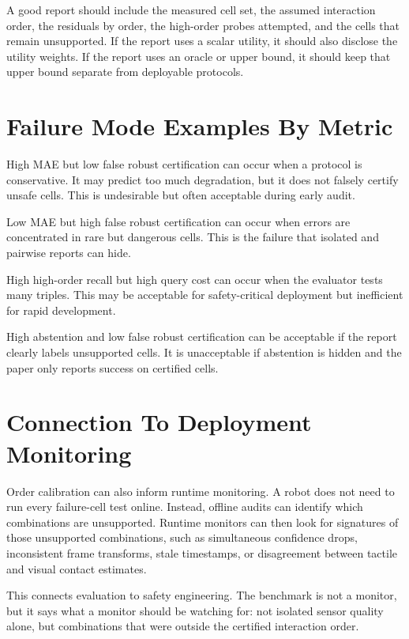 \documentclass{article}
\begin{document}
A good report should include the measured cell set, the assumed interaction order, the residuals by order, the high-order probes attempted, and the cells that remain unsupported. If the report uses a scalar utility, it should also disclose the utility weights. If the report uses an oracle or upper bound, it should keep that upper bound separate from deployable protocols.

\section{Failure Mode Examples By Metric}

High MAE but low false robust certification can occur when a protocol is conservative. It may predict too much degradation, but it does not falsely certify unsafe cells. This is undesirable but often acceptable during early audit.

Low MAE but high false robust certification can occur when errors are concentrated in rare but dangerous cells. This is the failure that isolated and pairwise reports can hide.

High high-order recall but high query cost can occur when the evaluator tests many triples. This may be acceptable for safety-critical deployment but inefficient for rapid development.

High abstention and low false robust certification can be acceptable if the report clearly labels unsupported cells. It is unacceptable if abstention is hidden and the paper only reports success on certified cells.

\section{Connection To Deployment Monitoring}

Order calibration can also inform runtime monitoring. A robot does not need to run every failure-cell test online. Instead, offline audits can identify which combinations are unsupported. Runtime monitors can then look for signatures of those unsupported combinations, such as simultaneous confidence drops, inconsistent frame transforms, stale timestamps, or disagreement between tactile and visual contact estimates.

This connects evaluation to safety engineering. The benchmark is not a monitor, but it says what a monitor should be watching for: not isolated sensor quality alone, but combinations that were outside the certified interaction order.
\end{document}
